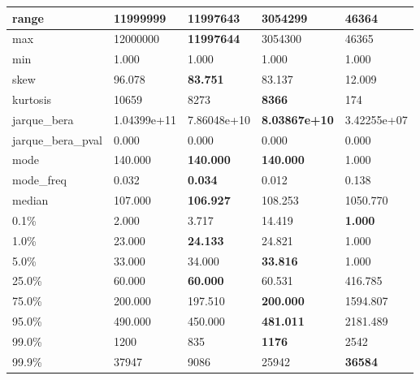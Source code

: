 \begin{table}[H]
\begin{tabular}{|l|m{10em}|m{10em}|m{10em}|m{10em}|}
\hline range & 11999999 & \bfseries 11997643 & 3054299 & \cellcolor[rgb]{0.9, 0.54, 0.52} 46364 \\
\hline max & 12000000 & \bfseries 11997644 & 3054300 & \cellcolor[rgb]{0.9, 0.54, 0.52} 46365 \\
\hline min & 1.000 & 1.000 & 1.000 & 1.000 \\
\hline skew & 96.078 & \bfseries 83.751 & 83.137 & \cellcolor[rgb]{0.9, 0.54, 0.52} 12.009 \\
\hline kurtosis & 10659 & 8273 & \bfseries 8366 & \cellcolor[rgb]{0.9, 0.54, 0.52} 174 \\
\hline jarque\_bera & 1.04399e+11 & 7.86048e+10 & \bfseries 8.03867e+10 & \cellcolor[rgb]{0.9, 0.54, 0.52} 3.42255e+07 \\
\hline jarque\_bera\_pval & 0.000 & 0.000 & 0.000 & 0.000 \\
\hline mode & 140.000 & \bfseries 140.000 & \bfseries 140.000 & \cellcolor[rgb]{0.9, 0.54, 0.52} 1.000 \\
\hline mode\_freq & 0.032 & \bfseries 0.034 & 0.012 & \cellcolor[rgb]{0.9, 0.54, 0.52} 0.138 \\
\hline median & 107.000 & \bfseries 106.927 & 108.253 & \cellcolor[rgb]{0.9, 0.54, 0.52} 1050.770 \\
\hline 0.1\% & 2.000 & 3.717 & \cellcolor[rgb]{0.9, 0.54, 0.52} 14.419 & \bfseries 1.000 \\
\hline 1.0\% & 23.000 & \bfseries 24.133 & 24.821 & \cellcolor[rgb]{0.9, 0.54, 0.52} 1.000 \\
\hline 5.0\% & 33.000 & 34.000 & \bfseries 33.816 & \cellcolor[rgb]{0.9, 0.54, 0.52} 1.000 \\
\hline 25.0\% & 60.000 & \bfseries 60.000 & 60.531 & \cellcolor[rgb]{0.9, 0.54, 0.52} 416.785 \\
\hline 75.0\% & 200.000 & 197.510 & \bfseries 200.000 & \cellcolor[rgb]{0.9, 0.54, 0.52} 1594.807 \\
\hline 95.0\% & 490.000 & 450.000 & \bfseries 481.011 & \cellcolor[rgb]{0.9, 0.54, 0.52} 2181.489 \\
\hline 99.0\% & 1200 & 835 & \bfseries 1176 & \cellcolor[rgb]{0.9, 0.54, 0.52} 2542 \\
\hline 99.9\% & 37947 & \cellcolor[rgb]{0.9, 0.54, 0.52} 9086 & 25942 & \bfseries 36584 \\
\hline
\end{tabular}
\end{table}
